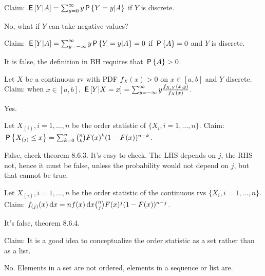 \documentclass[tf-tutorial-all.tex]{subfiles}
\begin{document}
\begin{truefalse}
Claim: $\E{Y|A} = \sum_{y=0}^{\infty} y \P{Y=y|A}$  if $Y$ is discrete.

\begin{solution}
No, what if $Y$ can take negative values?
\end{solution}
\end{truefalse}

\begin{truefalse}
Claim: $\E{Y|A} = \sum_{y=-\infty}^{\infty} y \P{Y=y|A} = 0$  if $\P{A}=0$ and $Y$ is discrete.

\begin{solution}
It is false, the definition in BH requires that $\P{A}>0$.
\end{solution}
\end{truefalse}


\begin{truefalse}
Let $X$ be a continuous rv with PDF $f_{X}(x) > 0$ on $x\in[a, b]$ and $Y$ discrete.
Claim: when $x\in [a, b]$, $\E{Y|X=x} = \sum_{y=-\infty}^{\infty} y \frac{f_{X,Y}(x,y)}{f_{X}(x)}$.

\begin{solution}
Yes.
\end{solution}
\end{truefalse}

\begin{truefalse}
Let $X_{(i)}, i = 1, \ldots, n$ be the order statistic of $\{X_{i}, i=1, \ldots, n\}$.
Claim: $\P{X_{(j)}\leq x} = \sum_{k=0}^{n}{n \choose k} F(x)^k (1-F(x))^{n-k}$.

\begin{solution}
False, check theorem 8.6.3.
It's easy to check.
The LHS depends on $j$, the RHS not, hence it must be false, unless the probability would not depend on $j$, but that cannot be true.
\end{solution}
\end{truefalse}


\begin{truefalse}
Let $X_{(i)}, i = 1, \ldots, n$ be the order statistic of the continuous rvs $\{X_{i}, i=1, \ldots, n\}$.
Claim: $f_{(j)}(x) \d x = n f(x) \d x {n \choose j} F(x)^j (1-F(x))^{n-j}$.
\begin{solution}
It's false, theorem 8.6.4.
\end{solution}
\end{truefalse}



\begin{truefalse}
Claim: It is a good idea to conceptualize the order statistic as a set rather than as a list.
\begin{solution}
No. Elements in a set are not ordered, elements in a sequence or list are.
\end{solution}
\end{truefalse}
\end{document}
